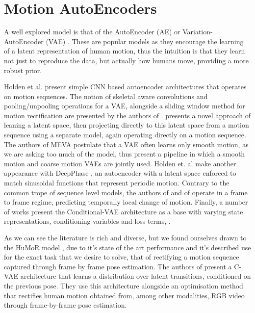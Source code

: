 \section{Motion AutoEncoders}

A well explored model is that of the AutoEncoder (AE) \cite{bank2021_autoencoders} or Variation-AutoEncoder (VAE) \cite{kingma2022_VAE}. These are popular models as they encourage the learning of a latent representation \cite{bank2021_autoencoders} of human motion, thus the intuition is that they learn not just to reproduce the data, but actually how humans move, providing a more robust prior.


Holden et al. \cite{ConvAutoEnv2015} \cite{ConvAutoEnv2016} present simple CNN based autoencoder architectures that operates on motion sequences. The notion of skeletal aware convolutions and pooling/unpooling operations for a VAE, alongside a sliding window method for motion rectification are presented by the authors of \cite{HierarchicalMotionVAE}. \cite{TransformerVAEPrior} presents a novel approach of leaning a latent space, then projecting directly to this latent space from a motion sequence using a separate model, again operating directly on a motion sequence. The authors of MEVA \cite{MEVA} postulate that a VAE often learns only smooth motion, as we are asking too much of the model, thus present a pipeline in which a smooth motion and coarse motion VAEs are jointly used. Holden et. al make another appearance with DeepPhase \cite{DeepPhase}, an autoencoder with a latent space enforced to match sinusoidal functions that represent periodic motion. Contrary to the common trope of sequence level models, the authors of \cite{learnedInbetweening} and of \cite{MotionVAE} operate in a frame to frame regime, predicting temporally local change of motion. Finally, a number of works present the Conditional-VAE architecture \cite{CVAE} as a base with varying state representations, conditioning variables and loss terms, \cite{humor, learnedInbetweening, MotionVAE, structured4Dlatentspace}.

As we can see the literature is rich and diverse, but we found ourselves drawn to the HuMoR model \cite{humor}, due to it's state of the art performance and it's described use for the exact task that we desire to solve, that of rectifying a motion sequence captured through frame by frame pose estimation. The authors of \cite{humor} present a C-VAE architecture that learns a distribution over latent transitions, conditioned on the previous pose. They use this architecture alongside an optimisation method that rectifies human motion obtained from, among other modalities, RGB video through frame-by-frame pose estimation.

